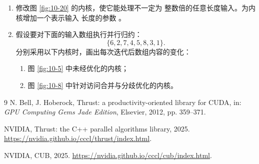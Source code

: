 \begin{enumerate}[label=\arabic*.,leftmargin=2.7em]
  \item 修改图 \ref{fig:10-20} 的内核，使它能处理不一定为
   整数倍的任意长度输入。为内核增加一个表示输入
  长度的参数 。

  \item 假设要对下面的输入数组执行并行归约：
  \[
    \{6,2,7,4,5,8,3,1\}.
  \]
  分别采用以下内核时，画出每次迭代后数组内容的变化：
  \begin{enumerate}[label=\alph*.,leftmargin=2.2em]
    \item 图 \ref{fig:10-5} 中未经优化的内核；
    \item 图 \ref{fig:10-8} 中针对访问合并与分歧优化的内核。
  \end{enumerate}
\end{enumerate}

\begin{chapterbibliography}{9}
  N. Bell, J. Hoberock, Thrust: a productivity-oriented library for CUDA,
  in: \emph{GPU Computing Gems Jade Edition}, Elsevier, 2012, pp. 359--371.

  NVIDIA, Thrust: the C++ parallel algorithms library, 2025.
  \url{https://nvidia.github.io/cccl/thrust/index.html}.

  NVIDIA, CUB, 2025.
  \url{https://nvidia.github.io/cccl/cub/index.html}.
\end{chapterbibliography}
